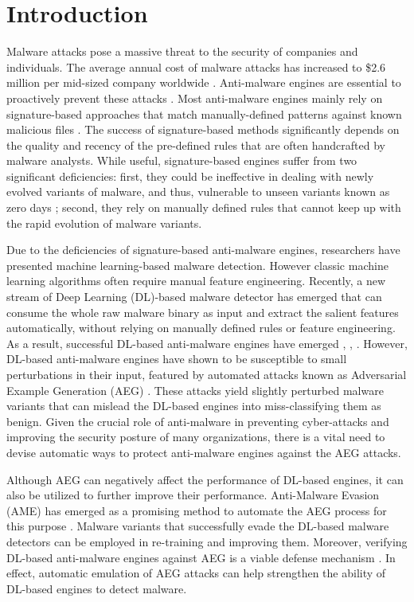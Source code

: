 \documentclass[letterpaper]{article}
\begin{document}
\section{Introduction}
\label{introduction}
\noindent Malware attacks pose a massive threat to the security of companies and individuals. The average annual cost of malware attacks has increased to \$2.6 million per mid-sized company worldwide \cite{bissell2019}. Anti-malware engines are essential to proactively prevent these attacks  \cite{tounsi2018survey}. Most anti-malware engines mainly rely on signature-based approaches that match manually-defined patterns against known malicious files \cite{anderson2018learning}. The success of signature-based methods significantly depends on the quality and recency of the pre-defined rules that are often handcrafted by malware analysts. While useful, signature-based engines suffer from two significant deficiencies: first, they could be ineffective in dealing with newly evolved variants of malware, and thus, vulnerable to unseen variants known as zero days \cite{chenB2019adversarial}; second, they rely on manually defined rules that cannot keep up with the rapid evolution of malware variants.

Due to the deficiencies of signature-based anti-malware engines, researchers have  presented machine learning-based malware detection. However classic machine learning algorithms often require manual feature engineering. Recently, a new stream of Deep Learning (DL)-based malware detector has emerged that can consume the whole raw malware binary as input and extract the salient features automatically, without relying on manually defined rules or feature engineering. As a result, successful DL-based anti-malware engines have emerged \cite{raff2018malware}, \cite{fleshman2019non}, \cite{krvcal2018deep}. However, DL-based anti-malware engines have shown to be susceptible to small perturbations in their input, featured by automated attacks known as Adversarial Example Generation (AEG) \cite{demetrio2019explaining}. These attacks yield slightly perturbed malware variants that can mislead the DL-based engines into miss-classifying them as benign. Given the crucial role of anti-malware in preventing cyber-attacks and improving the security posture of many organizations, there is a vital need to devise automatic ways to protect anti-malware engines against the AEG attacks.

Although AEG can negatively affect the performance of DL-based engines, it can also be utilized to further improve their performance. Anti-Malware Evasion (AME) has emerged as a promising method to automate the AEG process for this purpose \cite{chenY2019training}. Malware variants that successfully evade the DL-based malware detectors can be employed in re-training and improving them. Moreover, verifying DL-based anti-malware engines against AEG is a viable defense mechanism \cite{goodfellow2018making}. In effect, automatic emulation of AEG attacks can help strengthen the ability of DL-based engines to detect malware.
\end{document}
